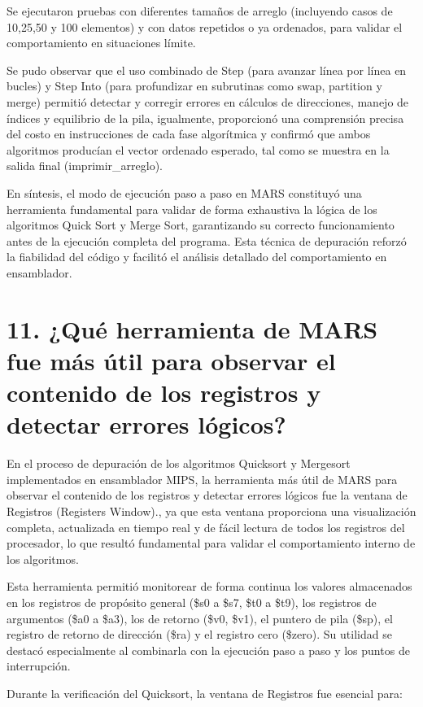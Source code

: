 \documentclass[12pt, letterpaper]{article}
\begin{document}
Se ejecutaron pruebas con diferentes tamaños de arreglo (incluyendo casos de 10,25,50 y 100 elementos) y con datos repetidos o ya ordenados, para validar el comportamiento en situaciones límite.

Se pudo observar que el uso combinado de Step (para avanzar línea por línea en bucles) y Step Into (para profundizar en subrutinas como swap, partition y merge) permitió detectar y corregir errores en cálculos de direcciones, manejo de índices y equilibrio de la pila, igualmente, proporcionó una comprensión precisa del costo en instrucciones de cada fase algorítmica y confirmó que ambos algoritmos producían el vector ordenado esperado, tal como se muestra en la salida final (imprimir\_arreglo).

En síntesis, el modo de ejecución paso a paso en MARS constituyó una herramienta fundamental para validar de forma exhaustiva la lógica de los algoritmos Quick Sort y Merge Sort, garantizando su correcto funcionamiento antes de la ejecución completa del programa. Esta técnica de depuración reforzó la fiabilidad del código y facilitó el análisis detallado del comportamiento en ensamblador.\newpage
\section*{11. ¿Qué herramienta de MARS fue más útil para observar el contenido de los registros y detectar errores lógicos?}

En el proceso de depuración de los algoritmos Quicksort y Mergesort implementados en ensamblador MIPS, la herramienta más útil de MARS para observar el contenido de los registros y detectar errores lógicos fue la ventana de Registros (Registers Window)., ya que esta ventana proporciona una visualización completa, actualizada en tiempo real y de fácil lectura de todos los registros del procesador, lo que resultó fundamental para validar el comportamiento interno de los algoritmos.

Esta herramienta permitió monitorear de forma continua los valores almacenados en los registros de propósito general (\$s0 a \$s7, \$t0 a \$t9), los registros de argumentos (\$a0 a \$a3), los de retorno (\$v0, \$v1), el puntero de pila (\$sp), el registro de retorno de dirección (\$ra) y el registro cero (\$zero). Su utilidad se destacó especialmente al combinarla con la ejecución paso a paso y los puntos de interrupción.

Durante la verificación del Quicksort, la ventana de Registros fue esencial para:
\end{document}
